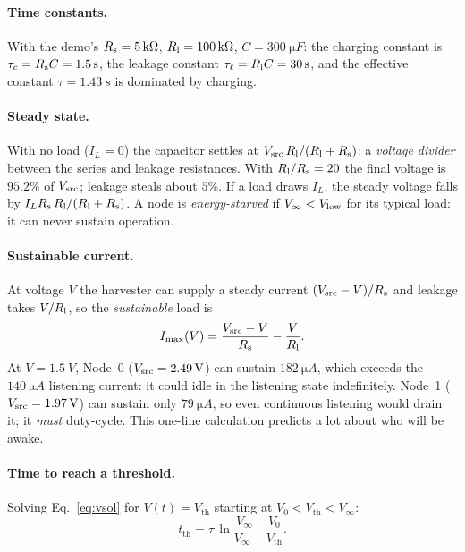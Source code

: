 \paragraph{Time constants.}
With the demo's $R_{\mathrm{s}}=\SI{5}{k\ohm}$, $R_{\mathrm{l}}=\SI{100}{k\ohm}$, $C=\SI{300}{\micro F}$:
the charging constant is $\tau_c=R_{\mathrm{s}} C=\SI{1.5}{s}$, the leakage constant
$\tau_\ell=R_{\mathrm{l}} C=\SI{30}{s}$, and the effective constant
$\tau=\SI{1.43}{s}$ is dominated by charging.

\paragraph{Steady state.}
With no load ($I_L=0$) the capacitor settles at
$V_{\mathrm{src}}\,R_{\mathrm{l}}/(R_{\mathrm{l}}+R_{\mathrm{s}})$: a \emph{voltage divider} between the series and
leakage resistances. With $R_{\mathrm{l}}/R_{\mathrm{s}}=20$ the final voltage is $95.2\%$ of $V_{\mathrm{src}}$; leakage steals about
$5\%$. If a load draws $I_L$, the steady voltage falls by $I_LR_{\mathrm{s}}\,R_{\mathrm{l}}/(R_{\mathrm{l}}+R_{\mathrm{s}})$.
A node is \emph{energy-starved} if $V_\infty<V_{\mathrm{low}}$ for its typical load: it can never
sustain operation.

\paragraph{Sustainable current.}
At voltage $V$ the harvester can supply a steady current $(V_{\mathrm{src}}-V)/R_{\mathrm{s}}$ and leakage takes
$V/R_{\mathrm{l}}$, so the \emph{sustainable} load is
\begin{equation}
 I_{\max}(V)=\frac{V_{\mathrm{src}}-V}{R_{\mathrm{s}}}-\frac{V}{R_{\mathrm{l}}}.
\end{equation}
At $V=\SI{1.5}{V}$, Node~0 ($V_{\mathrm{src}}=\SI{2.49}{V}$) can sustain $\SI{182}{\micro A}$, which
exceeds the $\SI{140}{\micro A}$ listening current: it could idle in the listening state indefinitely.
Node~1 ($V_{\mathrm{src}}=\SI{1.97}{V}$) can sustain only $\SI{79}{\micro A}$, so even
continuous listening would drain it; it \emph{must} duty-cycle. This one-line
calculation predicts a lot about who will be awake.

\paragraph{Time to reach a threshold.}
Solving Eq.~\eqref{eq:vsol} for $V(t)=V_{\mathrm{th}}$ starting at $V_0<V_{\mathrm{th}}<V_\infty$:
\begin{equation}
 t_{\mathrm{th}}=\tau\,\ln\frac{V_\infty-V_0}{V_\infty-V_{\mathrm{th}}}.
\label{eq:tth}
\end{equation}

